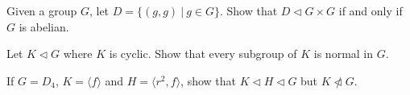 
\newcommand{\Z}{\mathbb{Z}}


Given a group $G$, let $D=\{(g,g)\ |\ g\in G\}$. Show that $D\lhd G\times G$ if and only if $G$ is abelian.
	

Let $K\lhd G$ where $K$ is cyclic. Show that every subgroup of $K$ is normal in $G$.


If $G=D_4$, $K=\langle f\rangle$ and $H=\langle r^2,f\rangle$, show that $K\lhd H\lhd G$ but $K\ntriangleleft G$.